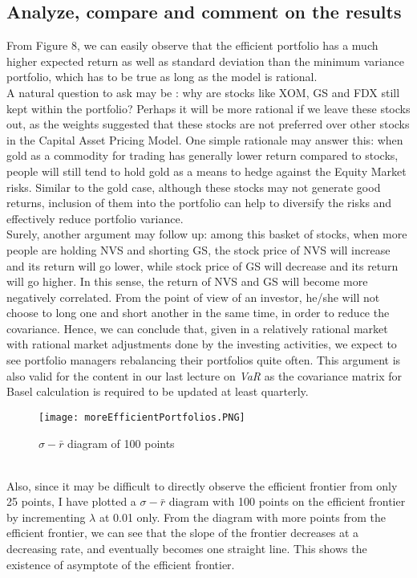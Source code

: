\subsection{Analyze, compare and comment on the results}
From Figure 8, we can easily observe that the efficient portfolio has a much higher expected return as well as standard deviation than the minimum variance portfolio, which has to be true as long as the model is rational.\\[4mm]
A natural question to ask may be : why are stocks like XOM, GS and FDX still kept within the portfolio? Perhaps it will be more rational if we leave these stocks out, as the weights suggested that these stocks are not preferred over other stocks in the Capital Asset Pricing Model. One simple rationale may answer this: when gold as a commodity for trading has generally lower return compared to stocks, people will still tend to hold gold as a means to hedge against the Equity Market risks. Similar to the gold case, although these stocks may not generate good returns, inclusion of them into the portfolio can help to diversify the risks and effectively reduce portfolio variance.\\[4mm]
Surely, another argument may follow up: among this basket of stocks, when more people are holding NVS and shorting GS, the stock price of NVS will increase and its return will go lower, while stock price of GS will decrease and its return will go higher. In this sense, the return of NVS and GS will become more negatively correlated. From the point of view of an investor, he/she will not choose to long one and short another in the same time, in order to reduce the covariance. Hence, we can conclude that, given in a relatively rational market with rational market adjustments done by the investing activities, we expect to see portfolio managers rebalancing their portfolios quite often. This argument is also valid for the content in our last lecture on \emph{VaR} as the covariance matrix for Basel calculation is required to be updated at least quarterly.
\begin{figure}[h]
	\centering
	\texttt{[image: moreEfficientPortfolios.PNG]}
	\caption{$\sigma-\bar{r}$ diagram of 100 points}
\end{figure}
\\[4mm]Also, since it may be difficult to directly observe the efficient frontier from only 25 points, I have plotted a $\sigma-\bar{r}$ diagram with 100 points on the efficient frontier by incrementing $\lambda$ at 0.01 only. From the diagram with more points from the efficient frontier, we can see that the slope of the frontier decreases at a decreasing rate, and eventually becomes one straight line. This shows the existence of asymptote of the efficient frontier.
